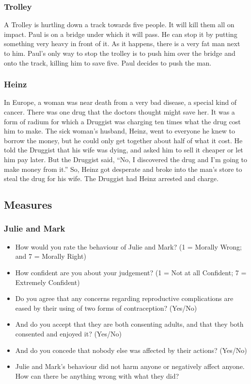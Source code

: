 \documentclass[
  american,
  man,floatsintext]{apa7}
\providecommand{\tightlist}{%
  \setlength{\itemsep}{0pt}\setlength{\parskip}{0pt}}
\begin{document}
\hypertarget{trolley}{%
\subsubsection{Trolley}\label{trolley}}

A Trolley is hurtling down a track towards five people. It will kill them all on impact. Paul is on a bridge under which it will pass. He can stop it by putting something very heavy in front of it. As it happens, there is a very fat man next to him. Paul's only way to stop the trolley is to push him over the bridge and onto the track, killing him to save five. Paul decides to push the man.

\hypertarget{heinz}{%
\subsubsection{Heinz}\label{heinz}}

In Europe, a woman was near death from a very bad disease, a special kind of cancer. There was one drug that the doctors thought might save her. It was a form of radium for which a Druggist was charging ten times what the drug cost him to make. The sick woman's husband, Heinz, went to everyone he knew to borrow the money, but he could only get together about half of what it cost. He told the Druggist that his wife was dying, and asked him to sell it cheaper or let him pay later. But the Druggist said, \enquote{No, I discovered the drug and I'm going to make money from it.} So, Heinz got desperate and broke into the man's store to steal the drug for his wife. The Druggist had Heinz arrested and charge.

\hypertarget{measures}{%
\subsection{Measures}\label{measures}}

\hypertarget{julie-and-mark-1}{%
\subsubsection{Julie and Mark}\label{julie-and-mark-1}}

\begin{itemize}
\tightlist
\item
  How would you rate the behaviour of Julie and Mark? (1 = Morally Wrong; and 7 = Morally Right)
\item
  How confident are you about your judgement? (1 = Not at all Confident; 7 = Extremely Confident)
\item
  Do you agree that any concerns regarding reproductive complications are eased by their using of two forms of contraception? (Yes/No)
\item
  And do you accept that they are both consenting adults, and that they both consented and enjoyed it? (Yes/No)
\item
  And do you concede that nobody else was affected by their actions? (Yes/No)
\item
  Julie and Mark's behaviour did not harm anyone or negatively affect anyone. How can there be anything wrong with what they did?
\end{itemize}
\end{document}
